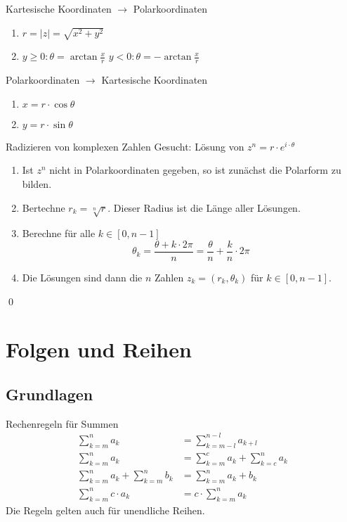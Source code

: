 \documentclass[german]{../spicker}
\renewcommand{\abs}[1]{\left| #1 \right|}
\begin{document}
\begin{algo}{Kartesische Koordinaten $\to$ Polarkoordinaten}
    \begin{enumerate}
        \item $r = \abs{z} = \sqrt{x^2 + y^2}$
        \item
              \subitem $y \geq 0 : \theta = \arctan \frac{x}{r}$
              \subitem $y < 0 : \theta = -\arctan \frac{x}{r}$
    \end{enumerate}
\end{algo}

\begin{algo}{Polarkoordinaten $\to$ Kartesische Koordinaten}
    \begin{enumerate}
        \item $x = r \cdot \cos \theta$
        \item $y = r \cdot \sin \theta$
    \end{enumerate}
\end{algo}

\begin{algo}{Radizieren von komplexen Zahlen}
    Gesucht: Lösung von $z^n = r \cdot e^{i\cdot \theta}$
    \begin{enumerate}
        \item Ist $z^n$ nicht in Polarkoordinaten gegeben, so ist zunächst die Polarform zu bilden.
        \item Bertechne $r_k = \sqrt[n]{r}$. Dieser Radius ist die Länge aller Lösungen.
        \item Berechne für alle $k \in [0, n-1]$
              $$
                  \theta_k = \frac{\theta + k\cdot 2\pi}{n} = \frac{\theta}{n} + \frac{k}{n} \cdot 2\pi
              $$
        \item Die Lösungen sind dann die $n$ Zahlen $z_k = (r_k, \theta_k)$ für $k \in [0, n-1]$.
    \end{enumerate}
    \qed
\end{algo}

\section{Folgen und Reihen}

\subsection{Grundlagen}
\begin{bonus}{Rechenregeln für Summen}
    $$
        \begin{aligned}
            \sum_{k=m}^n a_k                    & = \sum_{k=m-l}^{n-l} a_{k+l}          \\
            \sum_{k=m}^n a_k                    & = \sum_{k=m}^c a_k + \sum_{k=c}^n a_k \\
            \sum_{k=m}^n a_k + \sum_{k=m}^n b_k & = \sum_{k=m}^n a_k + b_k              \\
            \sum_{k=m}^n c\cdot a_k             & = c\cdot\sum_{k=m}^n a_k
        \end{aligned}
    $$
    Die Regeln gelten auch für unendliche Reihen.
\end{bonus}
\end{document}
